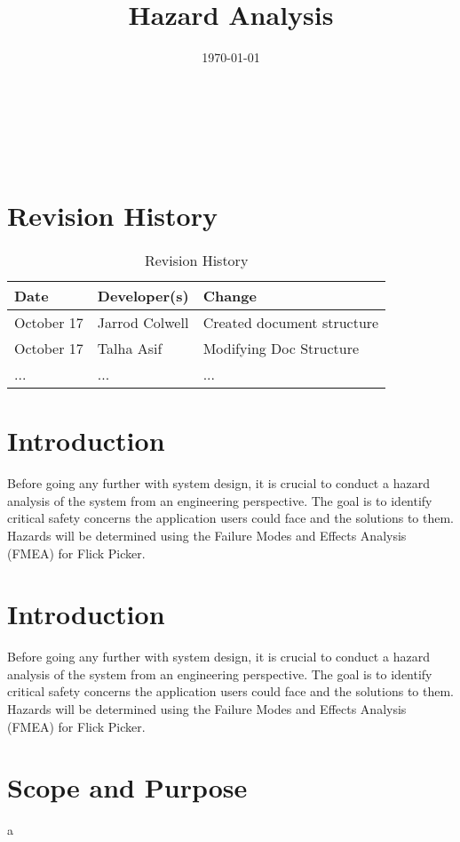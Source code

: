 \documentclass[12pt]{article}
\title{Hazard Analysis\\\progname}
\author{\authname}
\date{\today}
\begin{document}
\maketitle

~\newpage {}

\tableofcontents

~\newpage

\section*{Revision History}
\begin{table}[hp]
	\caption{Revision History} \label{TblRevisionHistory}
	\begin{tabularx}{\textwidth}{llX}
		\toprule
		\textbf{Date} & \textbf{Developer(s)} & \textbf{Change}\\
		\midrule
		October 17 & Jarrod Colwell & Created document structure\\
		October 17 & Talha Asif & Modifying Doc Structure\\
		... & ... & ...\\
		\bottomrule
		\end{tabularx}
\end{table}

	\newpage

\section{Introduction}
Before going any further with system design, it is crucial to conduct a hazard analysis of the system from an engineering perspective. The goal is to identify critical safety concerns the application users could face and the solutions to them. Hazards will be determined using the Failure Modes and Effects Analysis (FMEA) for Flick Picker.

\section{Introduction}
Before going any further with system design, it is crucial to conduct a hazard analysis of the system from an engineering perspective. The goal is to identify critical safety concerns the application users could face and the solutions to them. Hazards will be determined using the Failure Modes and Effects Analysis (FMEA) for Flick Picker.

\section{Scope and Purpose}
a
\end{document}
